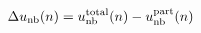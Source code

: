 \documentclass[12pt]{article}
\begin{document}
\begin{displaymath}
\Delta u_{\rm nb}(n) = 
u_{\rm nb}^{\rm total}(n) - 
u_{\rm nb}^{\rm part}(n)
\end{displaymath}
\end{document}
